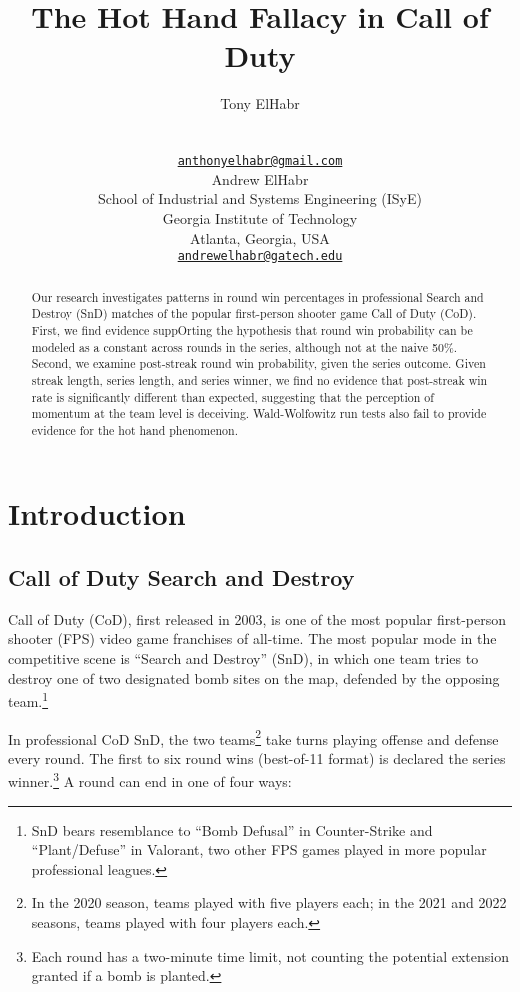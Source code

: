 \documentclass{article}
\title{The Hot Hand Fallacy in Call of Duty}
\author{
    Tony ElHabr
   \\
     \\
   \\
  \texttt{\href{mailto:anthonyelhabr@gmail.com}{\nolinkurl{anthonyelhabr@gmail.com}}} \\
   \And
    Andrew ElHabr
   \\
    School of Industrial and Systems Engineering (ISyE) \\
    Georgia Institute of Technology \\
  Atlanta, Georgia, USA \\
  \texttt{\href{mailto:andrewelhabr@gatech.edu}{\nolinkurl{andrewelhabr@gatech.edu}}} \\
  }
\begin{document}
\maketitle


\begin{abstract}
Our research investigates patterns in round win percentages in
professional Search and Destroy (SnD) matches of the popular
first-person shooter game Call of Duty (CoD). First, we find evidence
suppOrting the hypothesis that round win probability can be modeled as a
constant across rounds in the series, although not at the naive 50\%.
Second, we examine post-streak round win probability, given the series
outcome. Given streak length, series length, and series winner, we find
no evidence that post-streak win rate is significantly different than
expected, suggesting that the perception of momentum at the team level
is deceiving. Wald-Wolfowitz run tests also fail to provide evidence for
the hot hand phenomenon.
\end{abstract}


\hypertarget{introduction}{%
\section{Introduction}\label{introduction}}

\hypertarget{call-of-duty-search-and-destroy}{%
\subsection{Call of Duty Search and
Destroy}\label{call-of-duty-search-and-destroy}}

Call of Duty (CoD), first released in 2003, is one of the most popular
first-person shooter (FPS) video game franchises of all-time. The most
popular mode in the competitive scene is ``Search and Destroy'' (SnD),
in which one team tries to destroy one of two designated bomb sites on
the map, defended by the opposing team.\footnote{SnD bears resemblance
  to ``Bomb Defusal'' in Counter-Strike and ``Plant/Defuse'' in
  Valorant, two other FPS games played in more popular professional
  leagues.}

In professional CoD SnD, the two teams\footnote{In the 2020 season,
  teams played with five players each; in the 2021 and 2022 seasons,
  teams played with four players each.} take turns playing offense and
defense every round. The first to six round wins (best-of-11 format) is
declared the series winner.\footnote{Each round has a two-minute time
  limit, not counting the potential extension granted if a bomb is
  planted.} A round can end in one of four ways:
\end{document}
